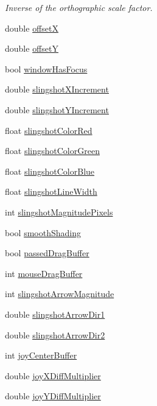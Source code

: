 \begin{DoxyCompactItemize}
\begin{DoxyCompactList}\small\item\em Inverse of the orthographic scale factor. \end{DoxyCompactList}\item 
double \hyperlink{class_mosaic_base_a743ebc8ce0afa0e9dbe869cad1b258bc}{offsetX}
\item 
double \hyperlink{class_mosaic_base_a7f85154572a64ea2b945d9582a002720}{offsetY}
\item 
bool \hyperlink{class_mosaic_base_a2c756e948372a8b472527b20fd80c6b6}{windowHasFocus}
\item 
double \hyperlink{class_mosaic_base_a1a8e2dce7bdb32457491c8037e72001e}{slingshotXIncrement}
\item 
double \hyperlink{class_mosaic_base_ac9782032891a2795ebd2a6e54c6e4ad9}{slingshotYIncrement}
\item 
float \hyperlink{class_mosaic_base_aaf5affe6645477a71b08d9a7250db9a9}{slingshotColorRed}
\item 
float \hyperlink{class_mosaic_base_a8b48adbc5cc23b8960ae0cd2974c631e}{slingshotColorGreen}
\item 
float \hyperlink{class_mosaic_base_a13c2c5a15d344a293dbefb5d8192f650}{slingshotColorBlue}
\item 
float \hyperlink{class_mosaic_base_a575b5ec3d304ec28fea8cec362110adc}{slingshotLineWidth}
\item 
int \hyperlink{class_mosaic_base_a9c134c7473ad9884d1b63e7029485036}{slingshotMagnitudePixels}
\item 
bool \hyperlink{class_mosaic_base_a4533c102656a9ea23c248740eca72bc2}{smoothShading}
\item 
bool \hyperlink{class_mosaic_base_aa38a3dd84d23829c9aa818d117b75d80}{passedDragBuffer}
\item 
int \hyperlink{class_mosaic_base_a7bdf4216affd6e30fc134a3eb300861b}{mouseDragBuffer}
\item 
int \hyperlink{class_mosaic_base_a25d029dec46301eee1e657d700e3e273}{slingshotArrowMagnitude}
\item 
double \hyperlink{class_mosaic_base_a9b2306b8335a0b7528a32b6d85759e08}{slingshotArrowDir1}
\item 
double \hyperlink{class_mosaic_base_a9c1669497925f491578950e209315fb0}{slingshotArrowDir2}
\item 
int \hyperlink{class_mosaic_base_a42f2ff99dc054743a0012864a9ede20d}{joyCenterBuffer}
\item 
double \hyperlink{class_mosaic_base_a34e740e98eebf938581b45f1f52cfdc9}{joyXDiffMultiplier}
\item 
double \hyperlink{class_mosaic_base_a2525d465488cb3369cffb853be10371e}{joyYDiffMultiplier}
\end{DoxyCompactItemize}

